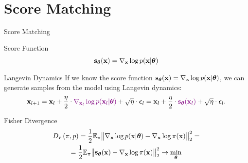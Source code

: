 \documentclass{beamer}
\begin{document}
\section{Score Matching}
\begin{frame}{Score Matching}
	\begin{block}{Score Function}
		\vspace{-0.3cm}
		 \[
			 \mathbf{s}_{\boldsymbol{\theta}}(\mathbf{x}) = \nabla_{\mathbf{x}}\log p(\mathbf{x}| \boldsymbol{\theta})
		 \]
		\vspace{-0.5cm}
	\end{block}
	\eqpause
	\begin{block}{Langevin Dynamics}
		If we know the score function $\mathbf{s}_{\boldsymbol{\theta}}(\mathbf{x}) = \nabla_{\mathbf{x}}\log p(\mathbf{x}| \boldsymbol{\theta})$, we can generate samples from the model using Langevin dynamics:
		\[
			\mathbf{x}_{l + 1} = \mathbf{x}_l + \frac{\eta}{2} \cdot {\color{violet}\nabla_{\mathbf{x}_l} \log p(\mathbf{x}_l | \boldsymbol{\theta})} + \sqrt{\eta} \cdot \boldsymbol{\epsilon}_l = \mathbf{x}_l + \frac{\eta}{2} \cdot {\color{violet}\mathbf{s}_{\boldsymbol{\theta}}(\mathbf{x}_l)} + \sqrt{\eta} \cdot \boldsymbol{\epsilon}_l.
		\]
		\vspace{-0.5cm}
	\end{block}
	\eqpause
	\begin{block}{Fisher Divergence}
		\vspace{-0.5cm}
		\begin{multline*}
			D_F(\pi, p) = \frac{1}{2}\mathbb{E}_{\pi}\big\| \nabla_{\mathbf{x}}\log p(\mathbf{x}| \boldsymbol{\theta}) - \nabla_{\mathbf{x}} \log \pi(\mathbf{x}) \big\|^2_2 =\\
			= \frac{1}{2}\mathbb{E}_{\pi}\big\| \mathbf{s}_{\boldsymbol{\theta}}(\mathbf{x}) - \nabla_{\mathbf{x}} \log \pi(\mathbf{x}) \big\|^2_2 \rightarrow \min_{\boldsymbol{\theta}}
		\end{multline*}
		\vspace{-0.3cm}
	\end{block}
\end{frame}
\end{document}
